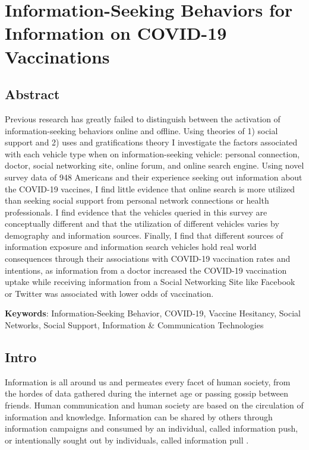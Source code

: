 \hypertarget{paper-2}{%
\chapter{Information-Seeking Behaviors for Information on COVID-19 Vaccinations}\label{paper-2}}

\hypertarget{abstract}{%
\section{Abstract}\label{abstract}}

Previous research has greatly failed to distinguish between the activation of
information-seeking behaviors online and offline. Using theories of 1) social
support and 2) uses and gratifications theory I investigate the factors associated
with each vehicle type when on information-seeking vehicle: personal connection,
doctor, social networking site, online forum, and online search engine. Using
novel survey data of 948 Americans and their experience seeking out
information about the COVID-19 vaccines, I find little evidence that online
search is more utilized than seeking social support from personal network
connections or health professionals. I find evidence that the vehicles queried
in this survey are conceptually different and that the utilization of different
vehicles varies by demography and information sources. Finally, I find that
different sources of information exposure and information search vehicles hold real
world consequences through their associations with COVID-19 vaccination rates
and intentions, as information from a doctor increased the COVID-19 vaccination
uptake while receiving information from a Social Networking Site like Facebook
or Twitter was associated with lower odds of vaccination.

\textbf{Keywords}: Information-Seeking Behavior, COVID-19, Vaccine Hesitancy, Social Networks, Social Support, Information \& Communication Technologies

\hypertarget{intro-1}{%
\section{Intro}\label{intro-1}}

Information is all around us and permeates every facet of human society, from
the hordes of data gathered during the internet age or passing gossip between
friends. Human communication and human society are based on the circulation of
information and knowledge. Information can be shared by others through
information campaigns and consumed by an individual, called information push, or
intentionally sought out by individuals, called information pull
\citep{cybenkoFoundationsInformationPush1999}.

